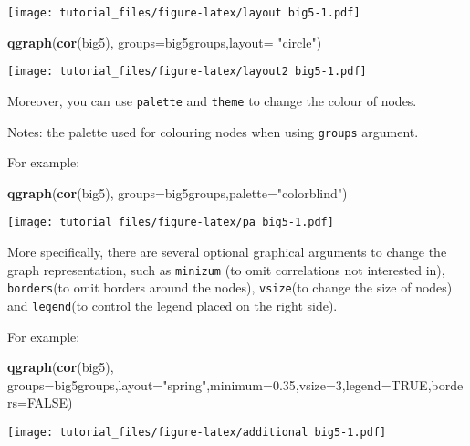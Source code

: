 \documentclass[]{article}
\newenvironment{Shaded}{\begin{snugshade}}{\end{snugshade}}
\newcommand{\KeywordTok}[1]{\textcolor[rgb]{0.13,0.29,0.53}{\textbf{#1}}}
\newcommand{\DataTypeTok}[1]{\textcolor[rgb]{0.13,0.29,0.53}{#1}}
\newcommand{\DecValTok}[1]{\textcolor[rgb]{0.00,0.00,0.81}{#1}}
\newcommand{\FloatTok}[1]{\textcolor[rgb]{0.00,0.00,0.81}{#1}}
\newcommand{\StringTok}[1]{\textcolor[rgb]{0.31,0.60,0.02}{#1}}
\newcommand{\OtherTok}[1]{\textcolor[rgb]{0.56,0.35,0.01}{#1}}
\newcommand{\NormalTok}[1]{#1}
\begin{document}
\texttt{[image: tutorial\_files/figure-latex/layout big5-1.pdf]}

\begin{Shaded}
\begin{Highlighting}[]
\KeywordTok{qgraph}\NormalTok{(}\KeywordTok{cor}\NormalTok{(big5), }\DataTypeTok{groups=}\NormalTok{big5groups,}\DataTypeTok{layout=} \StringTok{"circle"}\NormalTok{)}
\end{Highlighting}
\end{Shaded}

\texttt{[image: tutorial\_files/figure-latex/layout2 big5-1.pdf]}

Moreover, you can use \texttt{palette} and \texttt{theme} to change the
colour of nodes.

Notes: the palette used for colouring nodes when using \texttt{groups}
argument.

For example:

\begin{Shaded}
\begin{Highlighting}[]
\KeywordTok{qgraph}\NormalTok{(}\KeywordTok{cor}\NormalTok{(big5), }\DataTypeTok{groups=}\NormalTok{big5groups,}\DataTypeTok{palette=}\StringTok{"colorblind"}\NormalTok{)}
\end{Highlighting}
\end{Shaded}

\texttt{[image: tutorial\_files/figure-latex/pa big5-1.pdf]}

More specifically, there are several optional graphical arguments to
change the graph representation, such as \texttt{minizum} (to omit
correlations not interested in), \texttt{borders}(to omit borders around
the nodes), \texttt{vsize}(to change the size of nodes) and
\texttt{legend}(to control the legend placed on the right side).

For example:

\begin{Shaded}
\begin{Highlighting}[]
\KeywordTok{qgraph}\NormalTok{(}\KeywordTok{cor}\NormalTok{(big5), }\DataTypeTok{groups=}\NormalTok{big5groups,}\DataTypeTok{layout=}\StringTok{"spring"}\NormalTok{,}\DataTypeTok{minimum=}\FloatTok{0.35}\NormalTok{,}\DataTypeTok{vsize=}\DecValTok{3}\NormalTok{,}\DataTypeTok{legend=}\OtherTok{TRUE}\NormalTok{,}\DataTypeTok{borders=}\OtherTok{FALSE}\NormalTok{)}
\end{Highlighting}
\end{Shaded}

\texttt{[image: tutorial\_files/figure-latex/additional big5-1.pdf]}
\end{document}
